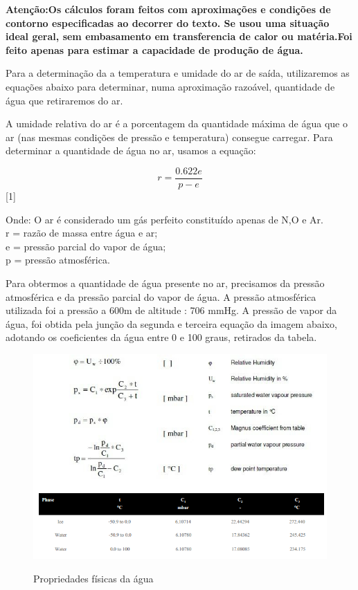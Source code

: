 \textbf{Atenção:Os cálculos foram feitos com aproximações e condições de contorno especificadas ao 
decorrer do texto. Se usou uma situação ideal geral, sem embasamento em transferencia de calor ou 
matéria.Foi feito apenas para estimar a capacidade de produção de água.}

Para a determinação da a temperatura e umidade do ar de saída, utilizaremos as equações abaixo 
para determinar, numa aproximação razoável, quantidade de água que retiraremos do ar.   

A umidade relativa do ar é a porcentagem da quantidade máxima de água que o ar (nas mesmas 
condições de pressão e temperatura) consegue carregar\footnotemark.
Para determinar a quantidade de água no ar, usamos a equação:\footnotemark
{}

\begin{equation}
 r = \frac{0.622e}{p - e}
\end{equation}[1]

Onde: O ar é considerado um gás perfeito constituído apenas de N,O e Ar.\\
r = razão de massa entre água e ar;\\
e = pressão parcial do vapor de água;\\
p = pressão atmosférica.

Para obtermos a quantidade de água presente no ar, precisamos da pressão atmosférica e da 
pressão parcial do vapor de água. A pressão atmosférica utilizada foi a pressão a 600m de altitude : 706 mmHg\footnotemark. A pressão de vapor da água, foi obtida pela junção da segunda e terceira equação da imagem 
abaixo, adotando os coeficientes da água entre 0 e 100 graus, retirados da tabela\footnotemark.
\begin{figure}[!h]
    \centering
    \includegraphics[scale = 1]{editaveis/figuras/tabela_calculo}
    \label{dados_agua}
    \caption[Propriedades físicas da água]{Propriedades físicas da água}
   \end{figure}
   \FloatBarrier
   
